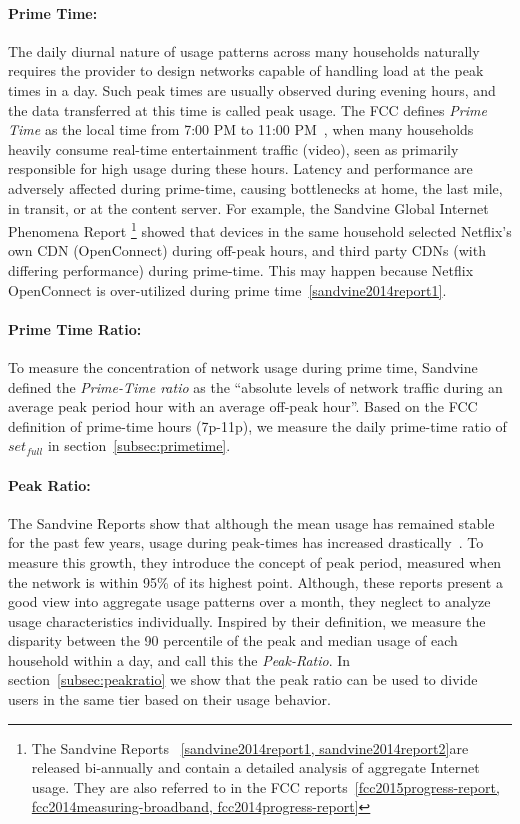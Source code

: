 \paragraph{Prime Time: }The daily diurnal nature of usage patterns across many
households naturally requires the provider to design networks capable of handling 
load at the peak times in a day. Such peak times are usually observed during
evening hours, and the data transferred at this time is called peak usage.
The FCC defines \emph{Prime Time} as the local time from 7:00 PM to 11:00
PM~\cite{fcc2014measuring-broadband}, when many
households heavily consume real-time entertainment traffic (video), seen as primarily
responsible for high usage during these hours. Latency and performance are adversely
affected during prime-time, causing bottlenecks at home, the last mile, in
transit, or at the content server. For example, the Sandvine Global
Internet Phenomena Report \footnote{The Sandvine Reports ~\ref{sandvine2014report1,
sandvine2014report2}are released bi-annually and
contain a detailed analysis of aggregate Internet usage. They are also referred
to in the FCC reports~\ref{fcc2015progress-report, fcc2014measuring-broadband,
fcc2014progress-report}} showed that devices in the same household selected Netflix's
own CDN (OpenConnect) during off-peak hours, and third party CDNs (with differing
performance) during prime-time. This may happen because Netflix OpenConnect is over-utilized
during prime time~\ref{sandvine2014report1}.

\paragraph{Prime Time Ratio: }To measure the concentration of network usage during prime time,
Sandvine defined the \emph{Prime-Time ratio} as the ``absolute levels of network traffic
during an average peak period hour with an average off-peak hour''. Based on the FCC
definition of prime-time hours (7p-11p), we measure the daily prime-time ratio of $set_{full}$
in section~\ref{subsec:primetime}.

\paragraph{Peak Ratio: }The Sandvine Reports show that although the mean usage has remained
stable for the past few years, usage during peak-times has increased
drastically~\cite{sandvine2014report1}. To measure this growth, they introduce the
concept of peak period, measured when the network is within 95\% of its highest point.
Although, these reports present a good view into aggregate usage patterns over a month,
they neglect to analyze usage characteristics individually. Inspired by their
definition, we measure the disparity between the 90 percentile of the peak and median
usage of each household within a day, and call this the \emph{Peak-Ratio}. In
section~\ref{subsec:peakratio} we show that the peak ratio can be used
to divide users in the same tier based on their usage behavior.

